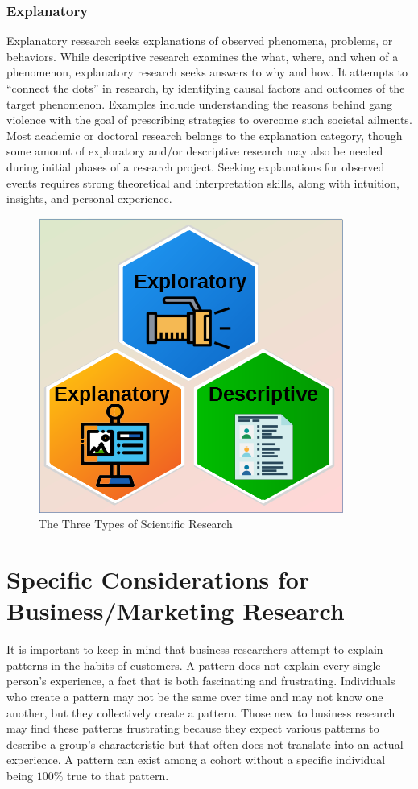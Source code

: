 \subsubsection{Explanatory}

Explanatory research seeks explanations of observed phenomena, problems, or behaviors. While descriptive research examines the what, where, and when of a phenomenon, explanatory research seeks answers to why and how. It attempts to ``connect the dots'' in research, by identifying causal factors and outcomes of the target phenomenon. Examples include understanding the reasons behind gang violence with the goal of prescribing strategies to overcome such societal ailments. Most academic or doctoral research belongs to the explanation category, though some amount of exploratory and/or descriptive research may also be needed during initial phases of a research project. Seeking explanations for observed events requires strong theoretical and interpretation skills, along with intuition, insights, and personal experience.

\begin{figure}[H]
	\centering
	\includegraphics[width=\maxwidth{.95\linewidth}]{gfx/01-types}
	\caption{The Three Types of Scientific Research}
	\label{01:fig06}
\end{figure}

\section{Specific Considerations for Business/Marketing Research}

It is important to keep in mind that business researchers attempt to explain patterns in the habits of customers. A pattern does not explain every single person's experience, a fact that is both fascinating and frustrating. Individuals who create a pattern may not be the same over time and may not know one another, but they collectively create a pattern. Those new to business research may find these patterns frustrating because they expect various patterns to describe a group's characteristic but that often does not translate into an actual experience. A pattern can exist among a cohort without a specific individual being $ 100\% $ true to that pattern.


